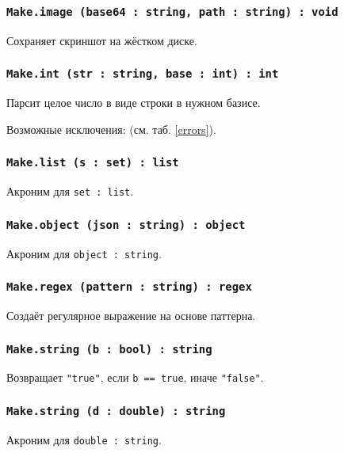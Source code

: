 \subsubsection{\lstinline|Make.image (base64 : string, path : string) : void|}

Сохраняет скриншот на жёстком диске.

\subsubsection{\lstinline|Make.int (str : string, base : int) : int|}

Парсит целое число в виде строки в нужном базисе.

Возможные исключения:  (см. таб. \ref{errors}).

\subsubsection{\lstinline|Make.list (s : set) : list|}

Акроним для \lstinline|set : list|.

\subsubsection{\lstinline|Make.object (json : string) : object|}

Акроним для \lstinline|object : string|.

\subsubsection{\lstinline|Make.regex (pattern : string) : regex|}

Создаёт регулярное выражение на основе паттерна.

\subsubsection{\lstinline|Make.string (b : bool) : string|}

Возвращает \lstinline|"true"|, если \lstinline|b == true|, иначе \lstinline|"false"|.

\subsubsection{\lstinline|Make.string (d : double) : string|}

Акроним для \lstinline|double : string|.

